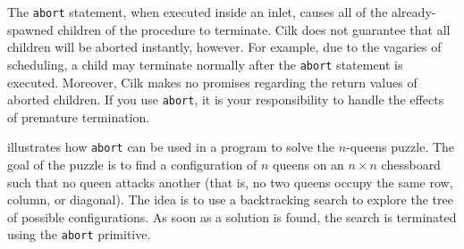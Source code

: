 The \texttt{abort} statement, when executed inside an inlet, causes
all of the already-spawned children of the procedure to terminate.
Cilk does not guarantee that all children will be aborted instantly,
however.  For example, due to the vagaries of scheduling, a child may
terminate normally after the \texttt{abort} statement is executed.
Moreover, Cilk makes no promises regarding the return values of
aborted children. If you use \texttt{abort}, it is your responsibility
to handle the effects of premature termination.

 illustrates how \texttt{abort} can be used in a
program to solve the $n$-queens puzzle. The goal of the puzzle is to
find a configuration of $n$ queens on an $n \times n$ chessboard such
that no queen attacks another (that is, no two queens occupy the same
row, column, or diagonal).  The idea is to use a backtracking search
to explore the tree of possible configurations.  As soon as a solution
is found, the search is terminated using the \texttt{abort} primitive.

